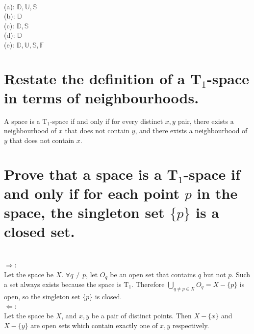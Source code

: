 \begin{solution}
 \\(a): $\mathbb{D}, \mathbb{U}, \mathbb{S}$ \\
 (b): $\mathbb{D}$ \\
 (c): $\mathbb{D}, \mathbb{S}$ \\
 (d): $\mathbb{D}$ \\
 (e): $\mathbb{D}, \mathbb{U}, \mathbb{S}, \mathbb{F}$ \\
\end{solution}


\begin{parts}
 \part{Restate the definition of a T$_1$-space in terms of neighbourhoods.}
 
 
\begin{solution}
 A space is a T$_1$-space if and only if for every distinct $x, y$ pair, there exists a neighbourhood of $x$ that does not contain $y$, and there exists a neighbourhood of $y$ that does not contain $x$.
\end{solution}

\part{Prove that a space is a T$_1$-space if and only if for each point $p$ in the space, the singleton set $\{p\}$ is a closed set.}

\begin{solution}
 \\$\Rightarrow$: \\
 Let the space be $X$. $\forall q \neq p$, let $O_q$ be an open set that contains $q$ but not $p$. Such a set always exists because the space is T$_1$. Therefore $\bigcup_{q \neq p \in X} O_q = X - \{p\}$ is open, so the singleton set $\{p\}$ is closed. \\
 $\Leftarrow$: \\
 Let the space be $X$, and $x, y$ be a pair of distinct points. Then $X - \{x\}$ and $X - \{y\}$ are open sets which contain exactly one of $x, y$ respectively.
\end{solution}
\end{parts}


